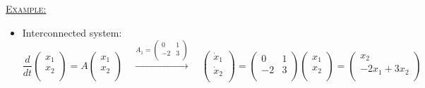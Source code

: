 \documentclass[12pt,a4paper]{article}
\begin{document}
\begin{tcolorbox}[breakable] %
\underline{\textsc{Example:}}
\begin{itemize}
\item Interconnected system:
\begin{equation*}
\frac{d}{dt} 
\begin{pmatrix}
x_{1}\\
x_{2}\\
\end{pmatrix}
=A
\begin{pmatrix}
x_{1}\\
x_{2}\\
\end{pmatrix}\quad \xrightarrow{A_{1}=\begin{pmatrix}
0 & 1\\
-2 & 3\\
\end{pmatrix}} \quad 
\begin{pmatrix}
\dot{x}_{1}\\
\dot{x}_{2}\\
\end{pmatrix} = 
\begin{pmatrix}
0 & 1\\
-2 & 3\\
\end{pmatrix}
\begin{pmatrix}
x_{1}\\
x_{2}\\
\end{pmatrix} = \begin{pmatrix}
x_{2}\\
-2x_{1}+3x_{2}\\
\end{pmatrix}
\end{equation*}


\end{itemize}
\end{tcolorbox}
\end{document}
